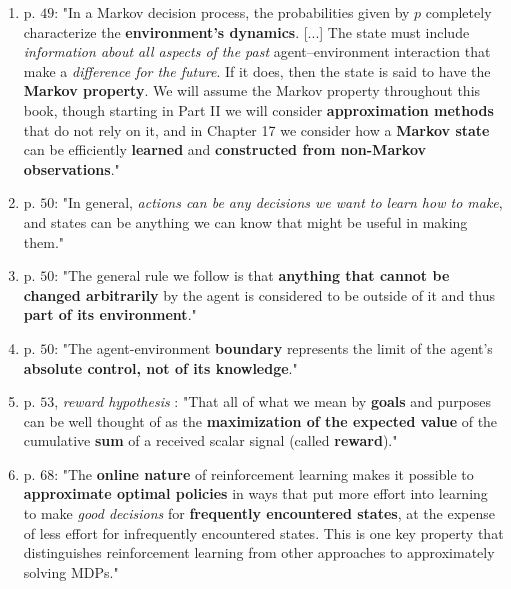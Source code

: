 \documentclass[10pt,a4paper]{article}
\begin{document}
\begin{enumerate}
\item p. $49$: "In a Markov decision process, the probabilities given by $p$ completely characterize the \textbf{environment's dynamics}. [...] The state must include \textit{information about all aspects of the past} agent–environment interaction that make a \textit{difference for the future}. If it
does, then the state is said to have the \textbf{Markov property}. We will assume the Markov
property throughout this book, though starting in Part II we will consider \textbf{approximation
methods} that do not rely on it, and in Chapter 17 we consider how a \textbf{Markov state} can
be efficiently \textbf{learned} and \textbf{constructed from non-Markov observations}."

\item p. $50$: "In general, \textit{actions can be any decisions we want to learn how to make}, and
states can be anything we can know that might be useful in making them."
\item p. $50$: "The general rule we follow is that \textbf{anything that cannot be changed arbitrarily} by
the agent is considered to be outside of it and thus \textbf{part of its environment}."
\item p. $50$: "The agent-environment \textbf{boundary} represents the limit of the
agent's \textbf{absolute control, not of its knowledge}."
\item p. $53$, \textit{reward hypothesis} : "That all of what we mean by \textbf{goals} and purposes can be well thought of as
the \textbf{maximization of the expected value} of the cumulative \textbf{sum} of a received
scalar signal (called \textbf{reward})."

\item p. $68$: "The \textbf{online nature} of reinforcement learning makes it possible to \textbf{approximate optimal policies} in ways that put more effort into learning to make \textit{good decisions} for
\textbf{frequently encountered states}, at the expense of less effort for infrequently encountered
states. This is one key property that distinguishes reinforcement learning from other
approaches to approximately solving MDPs."
\end{enumerate}
\end{document}
